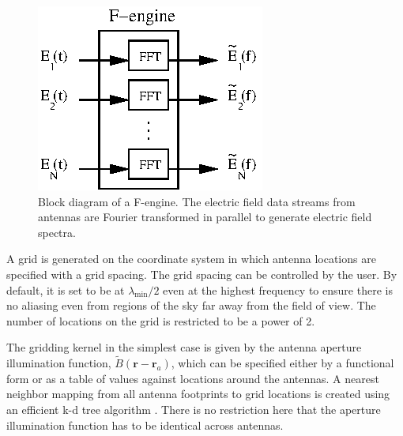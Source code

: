 \documentclass[a4paper,fleqn,usenatbib]{../mnras}
\begin{document}
\begin{figure}
  \includegraphics[width=\columnwidth]{F-engine.eps}
  \caption{Block diagram of a F-engine. The electric field data streams from
    antennas are Fourier transformed in parallel to generate electric field
    spectra.}
  \label{fig:f-engine}
\end{figure}

\par\medskip
{}
\par\medskip
\noindent A grid is generated on the coordinate system in which antenna 
locations are specified with a grid spacing. The grid spacing can be controlled 
by the user. By default, it is set to be at $\lambda_\textrm{min}/2$ even at the 
highest frequency to ensure there is no aliasing even from regions of the sky 
far away from the field of view. The number of locations on the grid is 
restricted to be a power of 2. 

The gridding kernel in the simplest case is given by the antenna aperture
illumination function, $\widetilde{B}(\mathbf{r}-\mathbf{r}_a)$, which can
be specified either by a functional form or as a table of values against 
locations around the antennas. A nearest neighbor mapping from all antenna 
footprints to grid locations is created using an efficient k-d tree algorithm 
\citep{man99}. There is no restriction here that the aperture illumination 
function has to be identical across antennas. 
\end{document}
